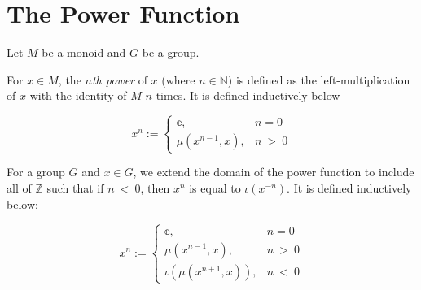 \section{The Power Function}

Let $M$ be a monoid and $G$ be a group.

\begin{definition}
    \label{definition : mpow}
    \leanok
    For $x \in M$, the \textit{$n$th power} of $x$ (where $n \in \mathbb{N}$) is defined as the left-multiplication of $x$ with the identity of $M$ $n$ times. It is defined inductively below

    \begin{equation*}
        x^n := \begin{cases}
            \mathbb{e}, & n = 0 \\
            \mu(x^{n-1}, x), & n ~>~ 0
        \end{cases}
    \end{equation*}
\end{definition}

\begin{definition}
    \label{definition : gpow}
    \leanok
    For a group $G$ and $x \in G$, we extend the domain of the power function to include all of $\mathbb{Z}$ such that if $n ~<~ 0$, then $x^n$ is equal to $\iota(x^{-n})$. It is defined inductively below:

    \begin{equation*}
        x^n := \begin{cases}
            \mathbb{e}, & n = 0 \\
            \mu(x^{n-1}, x), & n ~>~ 0 \\
            \iota(\mu(x^{n+1}, x)), & n ~<~ 0
        \end{cases}
    \end{equation*}
\end{definition}
